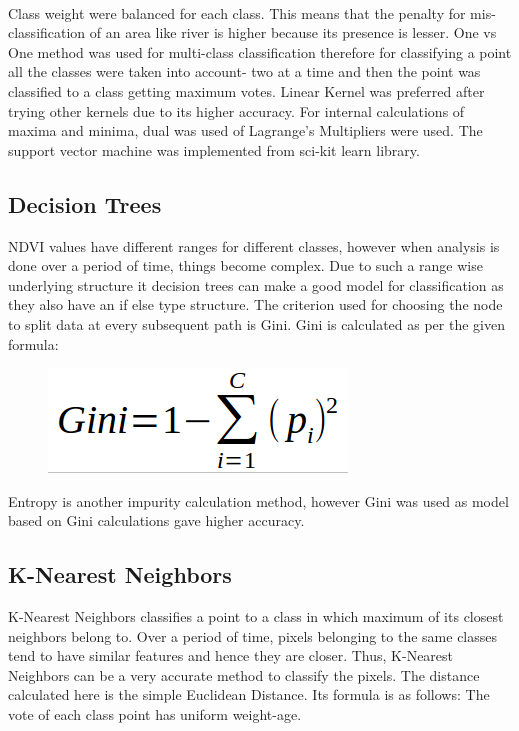 \documentclass[12pt, a4paper]{report}
\begin{document}
\paragraph{}
Class weight were balanced for each class. This means that the penalty for mis-classification of an area like river is higher because its presence is lesser. One vs One method was used for multi-class classification therefore for classifying a point all the classes were taken into account- two at a time and then the point was classified to a class getting maximum votes. Linear Kernel was preferred after trying other kernels due to its higher accuracy. For internal calculations of maxima and minima, dual was used of Lagrange's Multipliers were used. The support vector machine was implemented from sci-kit learn library.
\subsection {Decision Trees}
NDVI values have different ranges for different classes, however when analysis is done over a period of time, things become complex. Due to such a range wise  underlying structure it decision trees can make a good model for classification as they also have an if else type structure. The criterion used for choosing the node to split data at every subsequent path is Gini. Gini is calculated as per the given formula:
\begin{figure}[h]
\centering
\includegraphics[width=\textwidth]{giniformula.png}
\end{figure}
Entropy is another impurity calculation method, however Gini was used as model based on Gini calculations gave higher accuracy.
\subsection{K-Nearest Neighbors}
K-Nearest Neighbors  classifies a point to a class in which maximum of its closest neighbors belong to. Over a period of time, pixels belonging to the same classes tend to have similar features and hence they are closer. Thus, K-Nearest Neighbors can be a very accurate method to classify the pixels. The distance calculated here is the simple Euclidean Distance. Its formula is as follows:
The vote of each class point has uniform weight-age.
\end{document}
